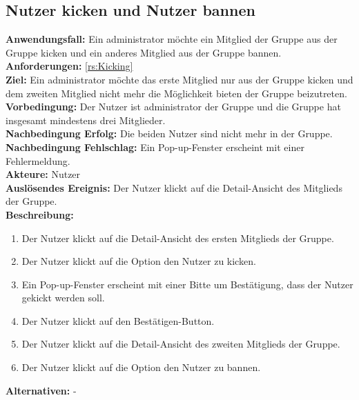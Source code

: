 \documentclass[parskip=full]{scrartcl}
\begin{document}
\subsection{Nutzer kicken und Nutzer bannen}
\textbf{Anwendungsfall:} Ein \Gls{administrator} möchte ein Mitglied der Gruppe aus der Gruppe kicken und ein anderes Mitglied aus der Gruppe bannen.\\
\textbf{Anforderungen:} \ref{rs:Kicking}\\
\textbf{Ziel:} Ein \Gls{administrator} möchte das erste Mitglied nur aus der Gruppe kicken und dem zweiten Mitglied nicht mehr die Möglichkeit bieten der Gruppe beizutreten.\\
\textbf{Vorbedingung:} Der Nutzer ist \Gls{administrator} der Gruppe und die Gruppe hat insgesamt mindestens drei Mitglieder.\\
\textbf{Nachbedingung Erfolg:} Die beiden Nutzer sind nicht mehr in der Gruppe.\\
\textbf{Nachbedingung Fehlschlag:} Ein Pop-up-Fenster erscheint mit einer Fehlermeldung.\\
\textbf{Akteure:} Nutzer\\
\textbf{Auslösendes Ereignis:} Der Nutzer klickt auf die Detail-Ansicht des Mitglieds der Gruppe.\\
\textbf{Beschreibung:}
\begin{enumerate}
    \item Der Nutzer klickt auf die Detail-Ansicht des ersten Mitglieds der Gruppe.
    \item Der Nutzer klickt auf die Option den Nutzer zu kicken.
    \item Ein Pop-up-Fenster erscheint mit einer Bitte um Bestätigung, dass der Nutzer gekickt werden soll.
    \item Der Nutzer klickt auf den Bestätigen-Button.
    \item Der Nutzer klickt auf die Detail-Ansicht des zweiten Mitglieds der Gruppe.
    \item Der Nutzer klickt auf die Option den Nutzer zu bannen.
\end{enumerate}
\textbf{Alternativen:} -
\newpage
\end{document}
